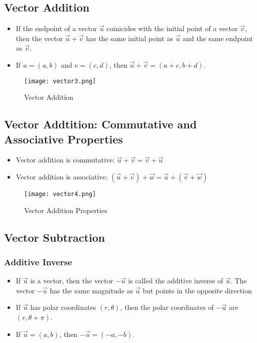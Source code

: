 \subsection{Vector Addition}
\begin{itemize}
\item If the endpoint of a vector \(\vec u\) coinicides with the initial point of a vector \(\vec v\), then the vector \(\vec u + \vec v\) has the same initial point as \(\vec u\) and the same endpoint as \(\vec v\).
\item If \(u = (a,b)\) and \(v = (c,d)\), then \(\vec u + \vec v = (a+c, b+d)\).
\end{itemize}
\begin{figure}
    \centering
    \texttt{[image: vector3.png]}
    \caption{Vector Addition}
    \label{fig:vector_addition}
\end{figure}

\subsection{Vector Addtition: Commutative and Associative Properties}
\begin{itemize}
    \item Vector addition is commutative: \(\vec u + \vec v = \vec v + \vec u\)
    \item Vector addition is associative: \((\vec u + \vec v) + \vec w = \vec u + (\vec v + \vec w)\)
\end{itemize}
\begin{figure}
    \centering
    \texttt{[image: vector4.png]}
    \caption{Vector Addition Properties}
    \label{fig:vector_subtraction}
\end{figure}

\subsection{Vector Subtraction}
\subsubsection{Additive Inverse}
\begin{itemize}
    \item If \(\vec u \) is a vector, then the vector \(-\vec u\) is called the additive inverse of \(\vec u\). The vector \(-\vec u\) has the same magnitude as \(\vec u\) but points in the opposite direction
    \item If \(\vec u\) has polar coordinates \((r, \theta)\), then the polar coordinates of \(-\vec u\) are \((r, \theta + \pi)\).
    \item If \(\vec u = (a,b)\), then \(-\vec u = (-a,-b)\).
\end{itemize}

